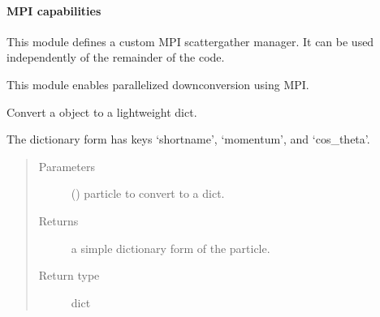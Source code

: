 \documentclass[letterpaper,10pt,english]{sphinxmanual}
\begin{document}
\paragraph{MPI capabilities}
\label{\detokenize{interface:module-scdc.mpi.base}}\label{\detokenize{interface:mpi-capabilities}}
This module defines a custom MPI scatter\sphinxhyphen{}gather manager. It can be used
independently of the remainder of the code.

\label{\detokenize{interface:module-scdc.mpi.sim}}
This module enables parallelized down\sphinxhyphen{}conversion using MPI.

\begin{fulllineitems}
\label{\detokenize{interface:scdc.mpi.sim.particle_as_dict}}
Convert a  object to a lightweight dict.

The dictionary form has keys ‘shortname’, ‘momentum’, and ‘cos\_theta’.
\begin{quote}\begin{description}
\item[{Parameters}] \leavevmode
{} () \textendash{} particle to convert to a dict.

\item[{Returns}] \leavevmode
a simple dictionary form of the particle.

\item[{Return type}] \leavevmode
dict

\end{description}\end{quote}

\end{fulllineitems}

\end{document}
